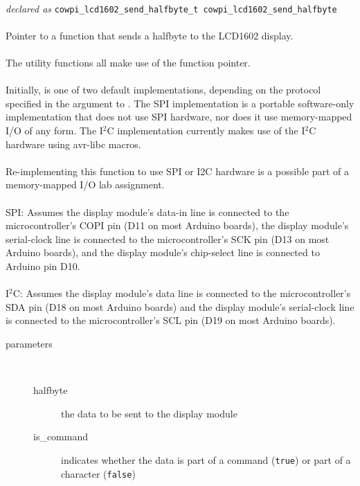 \begin{itemize}
{             \\
            \textit{declared as} \lstinline{cowpi_lcd1602_send_halfbyte_t cowpi_lcd1602_send_halfbyte} \\ \\
                Pointer to a function that sends a halfbyte to the LCD1602 display. \\ \\
                The  utility functions all make use of the  function pointer. \\ \\
                Initially,  is one of two default implementations, depending on the protocol specified in the argument to .
                The SPI implementation is a portable software-only implementation that does not use SPI hardware, nor does it use memory-mapped I/O of any form.
                The I$^2$C implementation currently makes use of the I$^2$C hardware using avr-libc macros. \\ \\
                Re-implementing this function to use SPI or I2C hardware is a possible part of a memory-mapped I/O lab assignment. \\ \\
                SPI: Assumes the display module's data-in line is connected to the microcontroller's COPI pin (D11 on most Arduino boards), the display module's serial-clock line is connected to the microcontroller's SCK pin (D13 on most Arduino boards), and the display module's chip-select line is connected to Arduino pin D10. \\ \\
                I$^2$C: Assumes the display module's data line is connected to the microcontroller's SDA pin (D18 on most Arduino boards) and the display module's serial-clock line is connected to the microcontroller's SCL pin (D19 on most Arduino boards).
                \begin{description}
                    \item[parameters] \
                    \begin{description}
                        \item[halfbyte] the data to be sent to the display module
                        \item[is\_command] indicates whether the data is part of a command (\lstinline{true}) or part of a character (\lstinline{false})

\end{description}
\end{description}}
\end{itemize}
